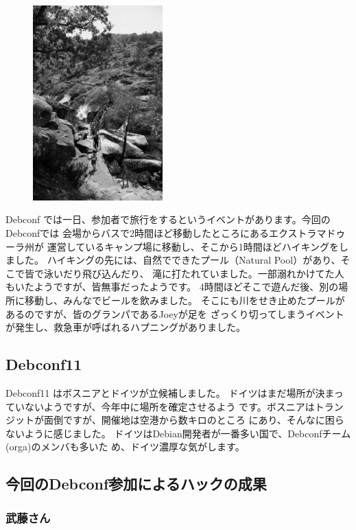 \documentclass[mingoth,a4paper]{jsarticle}
\begin{document}
\begin{figure}
\includegraphics[width=5cm]{image200908/debconf9_daytrip_mono.jpg}
\end{figure}

Debconf では一日、参加者で旅行をするというイベントがあります。今回の
Debconfでは 会場からバスで2時間ほど移動したところにあるエクストラマドゥーラ州が
運営しているキャンプ場に移動し、そこから1時間ほどハイキングをしました。
ハイキングの先には、自然でできたプール（Natural Pool）があり、そこで皆で泳いだり飛び込んだり、
滝に打たれていました。一部溺れかけてた人もいたようですが、皆無事だったようです。
4時間ほどそこで遊んだ後、別の場所に移動し、みんなでビールを飲みました。
そこにも川をせき止めたプールがあるのですが、皆のグランパであるJoeyが足を
ざっくり切ってしまうイベントが発生し、救急車が呼ばれるハプニングがありました。

\subsection{Debconf11}
Debconf11 はボスニアとドイツが立候補しました。
ドイツはまだ場所が決まっていないようですが、今年中に場所を確定させるよう
です。ボスニアはトランジットが面倒ですが、開催地は空港から数キロのところ
にあり、そんなに困らないように感じました。
ドイツはDebian開発者が一番多い国で、Debconfチーム(orga)のメンバも多いた
め、ドイツ濃厚な気がします。

\subsection{今回のDebconf参加によるハックの成果}
\subsubsection{武藤さん}
\end{document}
